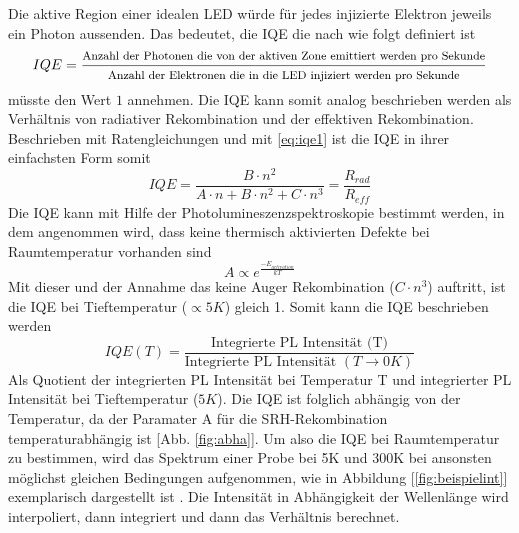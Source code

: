 \raggedright
Die aktive Region einer idealen LED würde für jedes injizierte Elektron jeweils ein Photon aussenden. 
Das bedeutet, die IQE die nach \cite{schub} wie folgt definiert ist
\begin{equation}
    IQE = \frac{ \footnotesize \text{Anzahl der Photonen die von der aktiven Zone emittiert werden pro Sekunde}}{ \footnotesize \text{Anzahl der Elektronen die in die LED injiziert werden pro Sekunde}}
\end{equation}
müsste den Wert $1$ annehmen. Die IQE kann somit analog beschrieben werden als Verhältnis von radiativer Rekombination und der effektiven Rekombination. Beschrieben mit Ratengleichungen und mit \ref{eq:iqe1} ist die IQE in ihrer einfachsten Form somit
\begin{equation}
    IQE = \frac{B \cdot n^2}{A \cdot n + B \cdot n^2 + C \cdot n^3} = \frac{R_{rad}}{R_{eff}}
\end{equation}
Die IQE kann mit Hilfe der Photolumineszenzspektroskopie bestimmt werden, in dem angenommen wird, dass keine thermisch aktivierten Defekte bei Raumtemperatur vorhanden sind
\begin{equation}
    A \propto e^{\frac{-E_{activation}}{kT}}
\end{equation}
Mit dieser und der Annahme das keine Auger Rekombination ($ C \cdot n^3 $) auftritt, ist die IQE bei Tieftemperatur ($ \propto 5K$) gleich 1. Somit kann die IQE beschrieben werden
\begin{equation}
    IQE(T) = \frac{\text{Integrierte PL Intensität (T)}}{ \text{Integrierte PL Intensität } (T \rightarrow 0 K) }
    \label{eq:standardiqe}
\end{equation}
Als Quotient der integrierten PL Intensität bei Temperatur T und integrierter PL Intensität bei Tieftemperatur ($5K$). Die IQE ist folglich abhängig von der Temperatur, da der Paramater A für die SRH-Rekombination temperaturabhängig ist [Abb. \ref{fig:abha}]. 
Um also die IQE bei Raumtemperatur zu bestimmen, wird das Spektrum einer Probe bei 5K und 300K bei ansonsten möglichst gleichen Bedingungen aufgenommen, wie in Abbildung [\ref{fig:beispielint}] exemplarisch dargestellt ist . Die Intensität in Abhängigkeit der Wellenlänge wird interpoliert, dann integriert und dann das Verhältnis berechnet. 
%